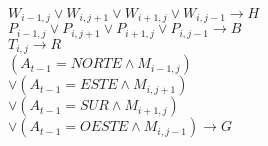 \documentclass{article}
\begin{document}
\noindent
$W_{i-1,j} \lor W_{i,j+1} \lor W_{i+1,j} \lor W_{i,j-1} \longrightarrow H$
\\
$P_{i-1,j} \lor P_{i,j+1} \lor P_{i+1,j} \lor P_{i,j-1} \longrightarrow B$
\\
$T_{i,j} \longrightarrow R$
\\
$ (A_{t-1} = NORTE \land M_{i-1,j})$
\\
$\lor (A_{t-1} = ESTE \land M_{i,j+1})$
\\
$\lor (A_{t-1} = SUR \land M_{i+1,j})$
\\
$\lor (A_{t-1} = OESTE \land M_{i,j-1}) \longrightarrow G$
\end{document}
